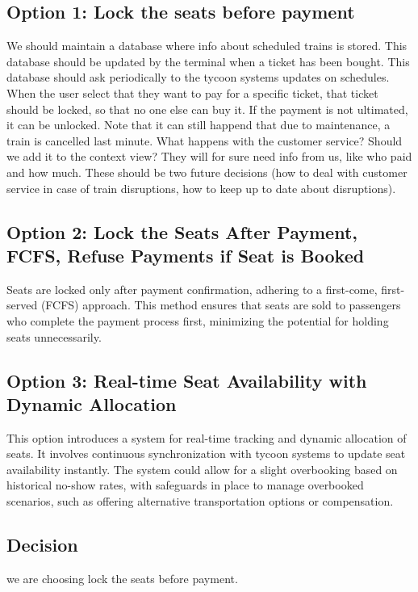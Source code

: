 \subsection*{Option 1: Lock the seats before payment}
We should maintain a database where info about scheduled trains is stored. 
This database should be updated by the terminal when a ticket has been bought.
This database should ask periodically to the tycoon systems updates on schedules.
When the user select that they want to pay for a specific ticket, that ticket should be locked, so that no one else can buy it. 
If the payment is not ultimated, it can be unlocked.
Note that it can still happend that due to maintenance, a train is cancelled last minute. 
What happens with the customer service? Should we add it to the context view? They will for sure need info from us, like who paid and how much. 
These should be two future decisions (how to deal with customer service in case of train disruptions, how to keep up to date about disruptions).

\subsection*{Option 2: Lock the Seats After Payment, FCFS, Refuse Payments if Seat is Booked}
Seats are locked only after payment confirmation, adhering to a first-come, first-served (FCFS) approach. This method ensures that seats are sold to passengers who complete the payment process first, minimizing the potential for holding seats unnecessarily.

\subsection*{Option 3: Real-time Seat Availability with Dynamic Allocation}
This option introduces a system for real-time tracking and dynamic allocation of seats. It involves continuous synchronization with tycoon systems to update seat availability instantly. The system could allow for a slight overbooking based on historical no-show rates, with safeguards in place to manage overbooked scenarios, such as offering alternative transportation options or compensation.

\subsection*{Decision}
we are choosing lock the seats before payment.


